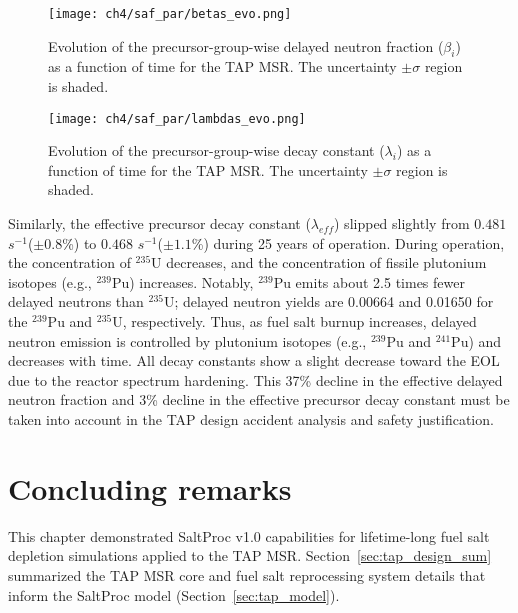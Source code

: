 \begin{figure}[htbp!] %
	\centering
	\texttt{[image: ch4/saf\_par/betas\_evo.png]}
		\vspace{-5mm}
	\caption{Evolution of the precursor-group-wise delayed neutron fraction 
	($\beta_i$) as a function of time for the \gls{TAP} \gls{MSR}. The 
	uncertainty $\pm\sigma$ 
	region is shaded.}
	\label{fig:beta-eol}
\end{figure}
\begin{figure}[hbbp!] %
	\centering
	\texttt{[image: ch4/saf\_par/lambdas\_evo.png]}
	\vspace{-5mm}
	\caption{Evolution of the precursor-group-wise decay constant 
	($\lambda_i$) as a function of time for the \gls{TAP} \gls{MSR}. The 
	uncertainty $\pm\sigma$ region is shaded.}
	\label{fig:lamda-eol}
\end{figure}

Similarly, the effective precursor decay constant ($\lambda_{eff}$) slipped 
slightly from $0.481$ $s^{-1}$($\pm0.8$\%) to $0.468$ $s^{-1}$($\pm1.1$\%) 
during 25 years of operation. During operation, the concentration of $^{235}$U 
decreases, and the concentration of fissile plutonium isotopes (e.g., 
$^{239}$Pu) 
increases. Notably, $^{239}$Pu emits about 2.5 times fewer delayed neutrons 
than $^{235}$U; delayed neutron yields are 0.00664 and 0.01650 for the 
$^{239}$Pu and $^{235}$U, respectively. Thus, as fuel salt burnup increases, 
delayed neutron emission is controlled by plutonium isotopes (e.g., $^{239}$Pu 
and $^{241}$Pu) and decreases with time. All decay constants show a slight 
decrease toward the \gls{EOL} due to the reactor spectrum hardening. This 37\% 
decline in the effective delayed neutron fraction and 3\% decline in the 
effective precursor decay constant must be taken into account in the \gls{TAP} 
design accident analysis and safety justification.



\newpage
\section{Concluding remarks}
This chapter demonstrated SaltProc v1.0 capabilities for lifetime-long fuel 
salt depletion simulations applied to the \gls{TAP} \gls{MSR}. 
Section~\ref{sec:tap_design_sum} summarized the \gls{TAP} \gls{MSR} core and 
fuel salt reprocessing system details that inform the SaltProc model 
(Section~\ref{sec:tap_model}).
 

